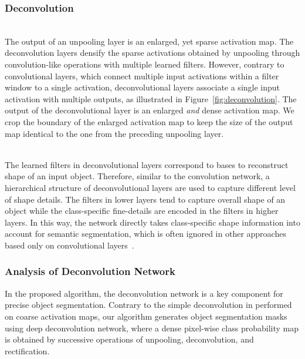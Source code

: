 \documentclass[10pt,twocolumn,letterpaper]{article}
\begin{document}
\subsubsection{Deconvolution}
\label{sec:deconv}
\ifdefined{} \\ \fi
The output of an unpooling layer is an enlarged, yet sparse activation map.
The deconvolution layers densify the sparse activations obtained by unpooling through convolution-like operations with multiple learned filters.
However, contrary to convolutional layers, which connect multiple input activations within a filter window to a single activation, deconvolutional layers associate a single input activation with multiple outputs, as illustrated in Figure~\ref{fig:deconvolution}.
The output of the deconvolutional layer is an enlarged {\em and} dense activation map. 
We crop the boundary of the enlarged activation map to keep the size of the output map identical to the one from the preceding unpooling layer.


\ifdefined{} \\ \fi
The learned filters in deconvolutional layers correspond to bases to reconstruct shape of an input object.
Therefore, similar to the convolution network, a hierarchical structure of deconvolutional layers are used to capture different level of shape details.
The filters in lower layers tend to capture overall shape of an object while the class-specific fine-details are encoded in the filters in higher layers.
In this way, the network directly takes class-specific shape information into account for semantic segmentation, which is often ignored in other approaches based only on convolutional layers~\cite{Deeplabcrf,Fcn}.

\iffalse
{\color{red}
For example, in our architecture, fc6-conv layer generates 1x1 4096 channel activations from its 7x7 512 channel input. 
In this situation, we can 7x7 512 channel output activation map from 1x1 4096 channel input using deconvolution layer. 
}
\fi


\subsubsection{Analysis of Deconvolution Network}
In the proposed algorithm, the deconvolution network is a key component for precise object segmentation. 
Contrary to the simple deconvolution in \cite{Fcn} performed on coarse activation maps, our algorithm generates object segmentation masks using deep deconvolution network, where a dense pixel-wise class probability map is obtained by successive operations of unpooling, deconvolution, and rectification.
\end{document}
